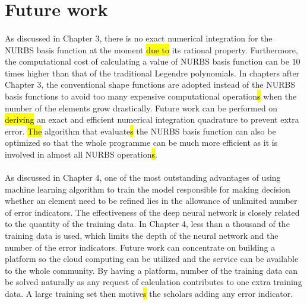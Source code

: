 \section{Future work}
\paragraph{}
As discussed in Chapter 3, there is no exact numerical integration for the NURBS basis function at the moment \hl{due to} its rational property.
Furthermore, the computational cost of calculating a value of NURBS basis function can be $10$ times higher than that of the traditional Legendre polynomials.
In chapters after Chapter 3, the conventional shape functions are adopted instead of the NURBS basis functions to avoid too many expensive computational operation\hl{s} when the number of the elements grow drastically.
Future work can be performed on \hl{deriving} an exact and efficient numerical integration quadrature to prevent extra error.
\hl{The} algorithm that evaluate\hl{s} the NURBS basis function can also be optimized so that the whole programme can be much more efficient as it is involved in almost all NURBS operation\hl{s}.

\paragraph{}
As discussed in Chapter 4, one of the most outstanding advantages of using machine learning algorithm to train the model responsible for making decision whether an element need to be refined lies in the allowance of unlimited number of error indicators.
The effectiveness of the deep neural network is closely related to the quantity of the training data.
In Chapter 4, less than a thousand of the training data is used, which limits the depth of the neural network and the number of the error indicators.
Future work can concentrate on building a platform so the cloud computing can be utilized and the service can be available to the whole community.
By having a platform, number of the training data can be solved naturally as any request of calculation contributes to one extra training data.
A large training set then motive\hl{s} the scholars adding any error indicator.
